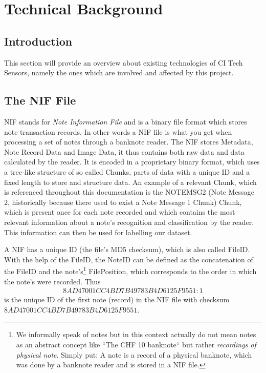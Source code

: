 \chapter{Technical Background}
\label{chap:technicalbackground}

\section{Introduction}
This section will provide an overview about existing technologies of CI Tech Sensors, namely the ones which are involved and affected by this project.

\section{The NIF File}
NIF stands for \emph{Note Information File} and is a binary file format which stores note transaction records. In other words a NIF file is what you get when processing a set of notes through a banknote reader. The NIF stores Metadata, Note Record Data and Image Data, it thus contains both raw data and data calculated by the reader. It is encoded in a proprietary binary format, which uses a tree-like structure of so called Chunks, parts of data with a unique ID and a fixed length to store and structure data. An example of a  relevant Chunk, which is referenced throughout this documentation is the NOTEMSG2 (Note Message 2, historically because there used to exist a Note Message 1 Chunk) Chunk, which is present once for each note recorded and which contains the most relevant information about a note's recognition and classification by the reader. This information can then be used for labelling our dataset. \par
A NIF has a unique ID (the file's MD5 checksum), which is also called FileID. With the help of the FileID, the NoteID can be defined as the concatenation of the FileID and the note's\footnote{We informally speak of notes but in this context actually do not mean notes as an abstract concept like ``The CHF 10 banknote`` but rather \emph{recordings of physical note}. Simply put: A note is a record of a physical banknote, which was done by a banknote reader and is stored in a NIF file.} FilePosition, which corresponds to the order in which the note's were recorded. Thus
\begin{align*}
8AD47001CC4BD7B49783B4D6125F9551:1
\end{align*}
is the unique ID of the first note (record) in the NIF file with checksum $8AD47001CC4BD7B49783B4D6125F9551$.

